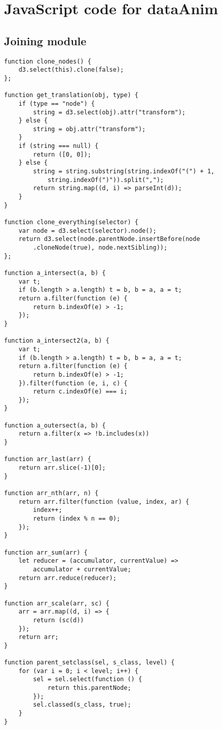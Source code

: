 \chapter{\textsf{JavaScript} code for \textbf{dataAnim}} \label{AppendixB}

\section{Joining module}

\begin{lstlisting}
function clone_nodes() {
    d3.select(this).clone(false);
};

function get_translation(obj, type) {
    if (type == "node") {
        string = d3.select(obj).attr("transform");
    } else {
        string = obj.attr("transform");
    }
    if (string === null) {
        return ([0, 0]);
    } else {
        string = string.substring(string.indexOf("(") + 1,
            string.indexOf(")")).split(",");
        return string.map((d, i) => parseInt(d));
    }
}

function clone_everything(selector) {
    var node = d3.select(selector).node();
    return d3.select(node.parentNode.insertBefore(node
        .cloneNode(true), node.nextSibling));
};

function a_intersect(a, b) {
    var t;
    if (b.length > a.length) t = b, b = a, a = t;
    return a.filter(function (e) {
        return b.indexOf(e) > -1;
    });
}

function a_intersect2(a, b) {
    var t;
    if (b.length > a.length) t = b, b = a, a = t;
    return a.filter(function (e) {
        return b.indexOf(e) > -1;
    }).filter(function (e, i, c) {
        return c.indexOf(e) === i;
    });
}

function a_outersect(a, b) {
    return a.filter(x => !b.includes(x))
}

function arr_last(arr) {
    return arr.slice(-1)[0];
}

function arr_nth(arr, n) {
    return arr.filter(function (value, index, ar) {
        index++;
        return (index % n == 0);
    });
}

function arr_sum(arr) {
    let reducer = (accumulator, currentValue) => 
        accumulator + currentValue;
    return arr.reduce(reducer);
}

function arr_scale(arr, sc) {
    arr = arr.map((d, i) => {
        return (sc(d))
    });
    return arr;
}

function parent_setclass(sel, s_class, level) {
    for (var i = 0; i < level; i++) {
        sel = sel.select(function () {
            return this.parentNode;
        });
        sel.classed(s_class, true);
    }
}


\end{lstlisting}
